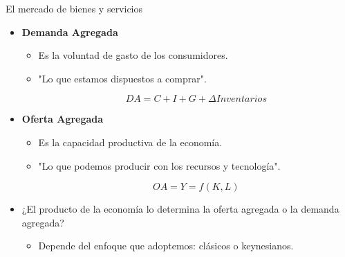 \documentclass{beamer}
\begin{document}
\begin{frame}{El mercado de bienes y servicios}

\begin{itemize}
    \item \textcolor{blue!80!black}{\textbf{Demanda Agregada}}     {\textcolor{blue!80!black}{\faCartPlus}} \\ \vspace{1mm}
    \begin{itemize}
    \item Es la voluntad de gasto de los consumidores. \vspace{1mm}
    \item "Lo que estamos dispuestos a comprar". 
            \begin{center}
            \begin{tcolorbox}[width=3in, boxsep=0pt, left=0pt, right=0pt, top=2pt, ,colframe = blue!70!black, colback = blue!7!white]%
                    $$ DA = C + I + G + \Delta Inventarios $$
             \end{tcolorbox}
             \end{center}
    \end{itemize} \vspace{2mm}
    \item \textcolor{blue!80!black}{\textbf{Oferta Agregada}}     {\textcolor{blue!80!black}{\faCogs}} \vspace{1mm}
    \begin{itemize}
    \item Es la capacidad productiva de la economía. \vspace{1mm}
    \item "Lo que podemos producir con los recursos y tecnología". 
            \begin{center}
            \begin{tcolorbox}[width=2in, boxsep=0pt, left=0pt, right=0pt, top=2pt, ,colframe = blue!70!black, colback = blue!7!white]%
                    $$ OA = Y =f(K,L)$$
             \end{tcolorbox}
             \end{center}
    \end{itemize}
\end{itemize}

\vspace{2mm}
\begin{itemize}
    \item ¿El producto de la economía lo determina la oferta agregada o la demanda agregada? 
    \begin{itemize}
    \item Depende del enfoque que adoptemos: clásicos o keynesianos.
    \end{itemize}
\end{itemize}

\end{frame}
\end{document}
